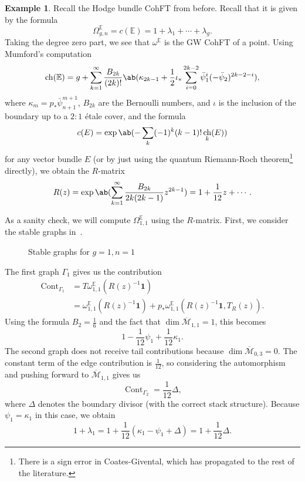\documentclass{amsart}
\theoremstyle{definition}
\newtheorem{exm}[thm]{Example}
\theoremstyle{remark}
\theoremstyle{plain}
\theoremstyle{definition}
\theoremstyle{remark}
\newcommand{\E}{\mathbb{E}}
\newcommand{\Mbar}{\overline{\mathcal{M}}}
\newcommand{\1}{\mathbf{1}}
\newcommand{\2}{\mathbf{2}}
\newcommand{\3}{\mathbf{3}}
\DeclareMathOperator{\ch}{ch}
\DeclareMathOperator{\Cont}{Cont}
\begin{document}
\begin{exm}
    Recall the Hodge bundle CohFT from before. Recall that it is given by the formula
    \[ \Omega^{\E}_{g,n} = c(\E) = 1 + \lambda_1 + \cdots + \lambda_g. \]
    Taking the degree zero part, we see that $\omega^{\E}$ is the GW CohFT of a point. Using Mumford's computation
    \[ \ch(\E) = g + \sum_{k=1}^{\infty} \frac{B_{2k}}{(2k)!}\ab(\kappa_{2k-1} + \frac{1}{2}\iota_*\sum_{i=0}^{2k-2} \bar{\psi}_1^{i} (-\bar{\psi}_2)^{2k-2-i}), \]
    where $\kappa_{m} = p_* \bar{\psi}_{n+1}^{m+1}$, $B_{2k}$ are the Bernoulli numbers, and $\iota$ is the inclusion of the boundary up to a $2:1$ \'etale cover, and the formula
    \[ c(E) = \exp \ab(-\sum_k (-1)^k (k-1)!\ch_k(E)) \]
    for any vector bundle $E$ (or by just using the quantum Riemann-Roch theorem\footnote{There is a sign error in Coates-Givental, which has propagated to the rest of the literature.} directly), we obtain the $R$-matrix
    \[ R(z) = \exp\ab( \sum_{k=1}^{\infty} \frac{B_{2k}}{2k(2k-1)} z^{2k-1}) = 1+\frac{1}{12}z + \cdots. \]

    As a sanity check, we will compute $\Omega_{1,1}^{\E}$ using the $R$-matrix. First, we consider the stable graphs in~.
    \begin{figure}[htpb]
    \begin{center}
    \end{center}
    \caption{Stable graphs for $g=1, n=1$}%
    \label{fig:03graphloop}
    \end{figure}
    The first graph $\Gamma_1$ gives us the contribution
    \begin{align*}
        \Cont_{\Gamma_1} &= T\omega_{1,1}^{\E}(R(z)^{-1}\1) \\
        &= \omega_{1,1}^{\E}(R(z)^{-1}\1) + p_* \omega_{1,1}^{\E}(R(z)^{-1}\1, T_R(z)).
    \end{align*}
    Using the formula $B_2 = \frac{1}{6}$ and the fact that $\dim \Mbar_{1,1} = 1$, this becomes
    \[ 1 - \frac{1}{12}\psi_1 + \frac{1}{12} \kappa_1. \]
    The second graph does not receive tail contributions because $\dim \Mbar_{0,3} = 0$. The constant term of the edge contribution is $\frac{1}{12}$, so considering the automorphism and pushing forward to $\Mbar_{1,1}$ gives us
    \[ \Cont_{\Gamma_2} = \frac{1}{12} \Delta, \]
    where $\Delta$ denotes the boundary divisor (with the correct stack structure). Because $\psi_1 = \kappa_1$ in this case, we obtain
    \[ 1+\lambda_1 = 1 + \frac{1}{12}(\kappa_1 - \psi_1 + \Delta) = 1 + \frac{1}{12} \Delta. \]
\end{exm}
\end{document}
